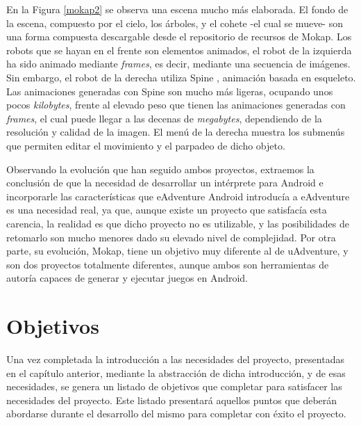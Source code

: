 En la Figura \ref{mokap2} se observa una escena mucho más elaborada. El fondo de la escena, compuesto por el cielo, los árboles, y el cohete -el cual se mueve- son una forma compuesta descargable desde el repositorio de recursos de Mokap. Los robots que se hayan en el frente son elementos animados, el robot de la izquierda ha sido animado mediante \textit{frames}, es decir, mediante una secuencia de imágenes. Sin embargo, el robot de la derecha utiliza Spine \cite{spine}, animación basada en esqueleto. Las animaciones generadas con Spine son mucho más ligeras, ocupando unos pocos \textit{kilobytes}, frente al elevado peso que tienen las animaciones generadas con \textit{frames}, el cual puede llegar a las decenas de \textit{megabytes}, dependiendo de la resolución y calidad de la imagen. El menú de la derecha muestra los submenús que permiten editar el movimiento y el parpadeo de dicho objeto.

Observando la evolución que han seguido ambos proyectos, extraemos la conclusión de que la necesidad de desarrollar un intérprete para Android e incorporarle las características que eAdventure Android introducía a eAdventure es una necesidad real, ya que, aunque existe un proyecto que satisfacía esta carencia, la realidad es que dicho proyecto no es utilizable, y las posibilidades de retomarlo son mucho menores dado su elevado nivel de complejidad. Por otra parte, su evolución, Mokap, tiene un objetivo muy diferente al de uAdventure, y son dos proyectos totalmente diferentes, aunque ambos son herramientas de autoría capaces de generar y ejecutar juegos en Android.

\chapter{Objetivos}
\label{objetivos}

Una vez completada la introducción a las necesidades del proyecto, presentadas en el capítulo anterior, mediante la abstracción de dicha introducción, y de esas necesidades, se genera un listado de objetivos que completar para satisfacer las necesidades del proyecto. Este listado presentará aquellos puntos que deberán abordarse durante el desarrollo del mismo para completar con éxito el proyecto.

